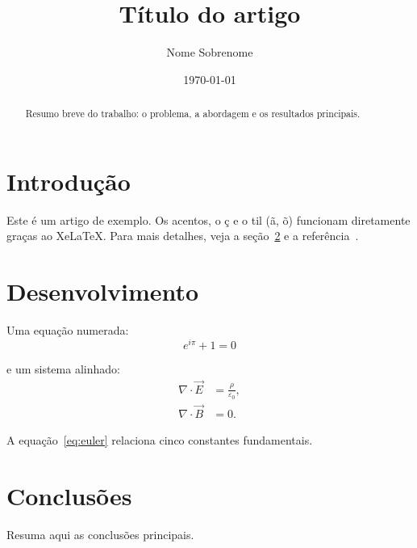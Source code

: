 \documentclass[11pt,a4paper]{article}
\title{Título do artigo}
\author{Nome Sobrenome}
\date{\today}
\begin{document}
\maketitle

\begin{abstract}
  Resumo breve do trabalho: o problema, a abordagem e os resultados principais.
\end{abstract}

\section{Introdução}
\label{sec:introducao}

Este é um artigo de exemplo. Os acentos, o ç e o til (ã, õ) funcionam
diretamente graças ao XeLaTeX. Para mais detalhes, veja a seção~\ref{sec:desenvolvimento} e a
referência~\cite{knuth1984}.

\section{Desenvolvimento}
\label{sec:desenvolvimento}

Uma equação numerada:
\begin{equation}
  \label{eq:euler}
  e^{i\pi} + 1 = 0
\end{equation}

e um sistema alinhado:
\begin{align}
  \nabla \cdot \vec{E} &= \frac{\rho}{\varepsilon_0}, \\
  \nabla \cdot \vec{B} &= 0.
\end{align}

A equação~\eqref{eq:euler} relaciona cinco constantes fundamentais.

\section{Conclusões}

Resuma aqui as conclusões principais.



\end{document}
